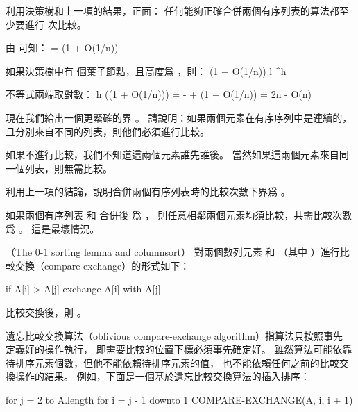 \startANSWER
\startformula
{}
\stopformula
\stopANSWER

\startitem
利用決策樹和上一項的結果，正面：
任何能夠正確合併兩個有序列表的算法都至少要進行  次比較。
\stopitem

\startANSWER
由 可知：
\startformula
{} = (1 + O(1/n))
\stopformula

如果決策樹中有  個葉子節點，且高度爲 ，則：
\startformula
{}(1 + O(1/n)) \le l ^h
\stopformula

不等式兩端取對數：
\startformula\startmathalignment
\NC h \NC \ge \lg\left((1 + O(1/n))\right) \NR
\NC   \NC =  - \lg{} + \lg(1 + O(1/n)) \NR
\NC   \NC = 2n - O(n) \NR
\stopmathalignment\stopformula
\stopANSWER
\stopigBase

現在我們給出一個更緊確的界 。
\startigBase[a,continue]
\startitem
請說明：如果兩個元素在有序序列中是連續的，且分別來自不同的列表，則他們必須進行比較。
\stopitem

\startANSWER
如果不進行比較，我們不知道這兩個元素誰先誰後。
當然如果這兩個元素來自同一個列表，則無需比較。
\stopANSWER

\startitem
利用上一項的結論，說明合併兩個有序列表時的比較次數下界爲 。
\stopitem

\startANSWER
如果兩個有序列表  和  合併後
爲 ，
則任意相鄰兩個元素均須比較，共需比較次數爲 。
這是最壞情況。
\stopANSWER
\stopigBase
\stopPROBLEM

\startPROBLEM
（The 0-1 sorting lemma and columnsort）
對兩個數列元素  和  （其中 ）進行{\EMP 比較交換}（{\EMP compare-exchange}）的形式如下：

\startCLRS
if A[i] > A[j]
	exchange A[i] with A[j]
\stopCLRS

比較交換後，則 。

{\EMP 遺忘比較交換算法（oblivious compare-exchange algorithm）}指算法只按照事先
定義好的操作執行，
即需要比較的位置下標必須事先確定好。
雖然算法可能依靠待排序元素個數，但他不能依賴待排序元素的值，
也不能依賴任何之前的比較交換操作的結果。
例如，下面是一個基於遺忘比較交換算法的插入排序：

\startCLRS
for j = 2 to A.length
	for i = j - 1 downto 1
		COMPARE-EXCHANGE(A, i, i + 1)
\stopCLRS

